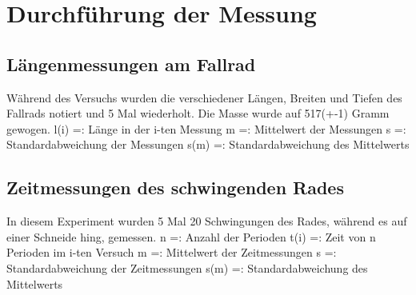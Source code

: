 \section{Durchführung der Messung}

\subsection{Längenmessungen am Fallrad}
Während des Versuchs wurden die verschiedener Längen, Breiten und Tiefen des Fallrads notiert und 5 Mal wiederholt.
Die Masse wurde auf 517(+-1) Gramm gewogen.
\newline
\newline
l(i) =: Länge in der i-ten Messung
\newline
m =: Mittelwert der Messungen
\newline
s =: Standardabweichung der Messungen
\newline
s(m) =: Standardabweichung des Mittelwerts
\begin{table}[thb]
  \centering
  \hline
\end{table}

\subsection{Zeitmessungen des schwingenden Rades}
In diesem Experiment wurden 5 Mal 20 Schwingungen des Rades, während es auf einer Schneide hing, gemessen.
\newline
\newline
n =: Anzahl der Perioden
\newline
t(i) =: Zeit von n Perioden im i-ten Versuch
\newline
m =: Mittelwert der Zeitmessungen
\newline
s =: Standardabweichung der Zeitmessungen
\newline
s(m) =: Standardabweichung des Mittelwerts
\begin{table}[thb]
	\centering
	\hline
\end{table}


